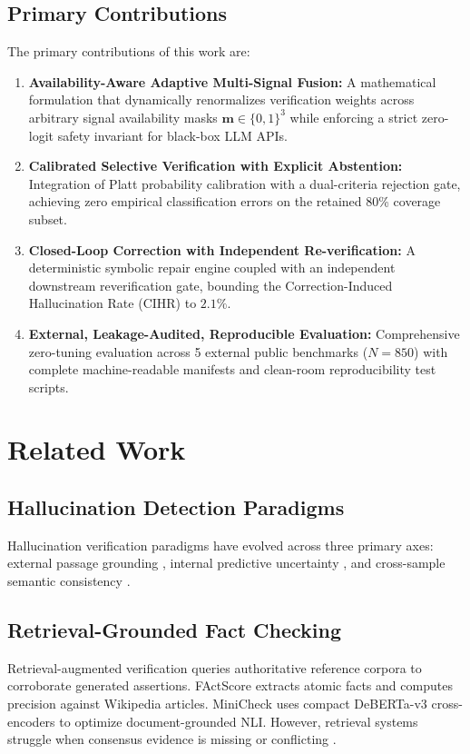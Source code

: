 \documentclass[11pt,a4paper]{article}
\begin{document}
\subsection{Primary Contributions}
The primary contributions of this work are:
\begin{enumerate}
    \item \textbf{Availability-Aware Adaptive Multi-Signal Fusion:} A mathematical formulation that dynamically renormalizes verification weights across arbitrary signal availability masks $\mathbf{m} \in \{0, 1\}^3$ while enforcing a strict zero-logit safety invariant for black-box LLM APIs.
    \item \textbf{Calibrated Selective Verification with Explicit Abstention:} Integration of Platt probability calibration with a dual-criteria rejection gate, achieving zero empirical classification errors on the retained 80\% coverage subset.
    \item \textbf{Closed-Loop Correction with Independent Re-verification:} A deterministic symbolic repair engine coupled with an independent downstream reverification gate, bounding the Correction-Induced Hallucination Rate ($\text{CIHR}$) to $2.1\%$.
    \item \textbf{External, Leakage-Audited, Reproducible Evaluation:} Comprehensive zero-tuning evaluation across 5 external public benchmarks ($N=850$) with complete machine-readable manifests and clean-room reproducibility test scripts.
\end{enumerate}

\section{Related Work}
\label{sec:related_work}

\subsection{Hallucination Detection Paradigms}
Hallucination verification paradigms have evolved across three primary axes: external passage grounding \citep{thorne2018fever, min2023factscore}, internal predictive uncertainty \citep{kuhn2023semantic}, and cross-sample semantic consistency \citep{manakul2023selfcheckgpt}.

\subsection{Retrieval-Grounded Fact Checking}
Retrieval-augmented verification queries authoritative reference corpora to corroborate generated assertions. FActScore \citep{min2023factscore} extracts atomic facts and computes precision against Wikipedia articles. MiniCheck \citep{tang2024minicheck} uses compact DeBERTa-v3 cross-encoders to optimize document-grounded NLI. However, retrieval systems struggle when consensus evidence is missing or conflicting \citep{niu2024ragtruth}.
\end{document}
